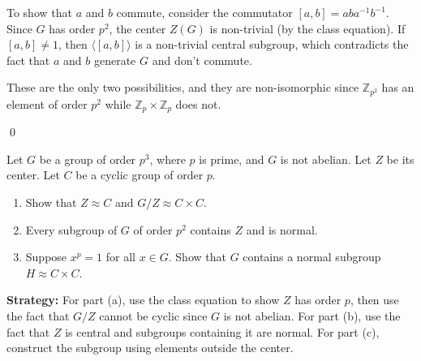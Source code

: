 To show that $a$ and $b$ commute, consider the commutator $[a,b] = aba^{-1}b^{-1}$. Since $G$ has order $p^2$, the center $Z(G)$ is non-trivial (by the class equation). If $[a,b] \neq 1$, then $\langle [a,b] \rangle$ is a non-trivial central subgroup, which contradicts the fact that $a$ and $b$ generate $G$ and don't commute.

These are the only two possibilities, and they are non-isomorphic since $\mathbb{Z}_{p^2}$ has an element of order $p^2$ while $\mathbb{Z}_p \times \mathbb{Z}_p$ does not.


\qed
\begin{problembox}
Let $G$ be a group of order $p^3$, where $p$ is prime, and $G$ is not abelian. Let $Z$ be its center. Let $C$ be a cyclic group of order $p$.
\begin{enumerate}[label=(\alph*)]
\item Show that $Z \approx C$ and $G/Z \approx C \times C$.
\item Every subgroup of $G$ of order $p^2$ contains $Z$ and is normal.
\item Suppose $x^p = 1$ for all $x \in G$. Show that $G$ contains a normal subgroup $H \approx C \times C$.
\end{enumerate}
\end{problembox}

\noindent\textbf{Strategy:} For part (a), use the class equation to show $Z$ has order $p$, then use the fact that $G/Z$ cannot be cyclic since $G$ is not abelian. For part (b), use the fact that $Z$ is central and subgroups containing it are normal. For part (c), construct the subgroup using elements outside the center.


